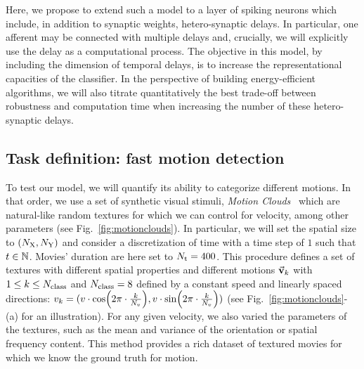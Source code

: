 \documentclass[default]{sn-jnl}%
\theoremstyle{thmstyleone}%
\theoremstyle{thmstyletwo}%
\theoremstyle{thmstylethree}%
\newcommand{\seeFig}[1]{see Fig.~\ref{fig:#1}}%
\begin{document}
Here, we propose to extend such a model to a layer of spiking neurons which include, in addition to synaptic weights, hetero-synaptic delays. In particular, one afferent may be connected with multiple delays and, crucially, we will explicitly use the delay as a computational process. The objective in this model, by including the dimension of temporal delays, is to increase the representational capacities of the classifier. In the perspective of building energy-efficient algorithms, we will also titrate quantitatively the best trade-off between robustness and computation time when increasing the number of these hetero-synaptic delays.
%
\subsection{Task definition: fast motion detection}
%
To test our model, we will quantify its ability to categorize different motions. In that order, we use a set of synthetic visual stimuli, \textit{Motion Clouds}~\cite{leon2012motion} which are natural-like random textures for which we can control for velocity, among other parameters (\seeFig{motionclouds}). In particular, we will set the spatial size to $(N_\text{X}, N_\text{Y})$ and consider a discretization of time with a time step of $1$ such that $t \in \mathbb{N}$. Movies' duration are here set to $N_\text{t}=400$.
This procedure defines a set of textures with different spatial properties and different motions $\va{v}_k$ with  $1 \le k \le N_\text{class}$ and $N_\text{class}=8$ defined by a constant speed and linearly spaced directions:
$
v_k = 
  ( 
    v \cdot \cos(2\pi\cdot \frac{k}{N_v}),
    v \cdot \sin(2\pi\cdot \frac{k}{N_v})
  )
$ (\seeFig{motionclouds}-(a) for an illustration).
For any given velocity, we also varied the parameters of the textures, such as the mean and variance of the orientation or spatial frequency content. This method provides a rich dataset of textured movies for which we know the ground truth for motion.
\end{document}
